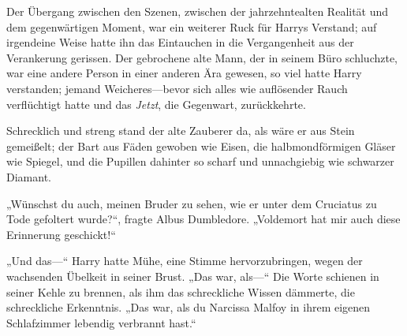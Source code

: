 % 
Der Übergang zwischen den Szenen, zwischen der jahrzehntealten Realität und dem gegenwärtigen Moment, war ein weiterer Ruck für Harrys Verstand; auf irgendeine Weise hatte ihn das Eintauchen in die Vergangenheit aus der Verankerung gerissen. Der gebrochene alte Mann, der in seinem Büro schluchzte, war eine andere Person in einer anderen Ära gewesen, so viel hatte Harry verstanden; jemand Weicheres—bevor sich alles wie auflösender Rauch verflüchtigt hatte und das \emph{Jetzt}, die Gegenwart, zurückkehrte.

Schrecklich und streng stand der alte Zauberer da, als wäre er aus Stein gemeißelt; der Bart aus Fäden gewoben wie Eisen, die halbmondförmigen Gläser wie Spiegel, und die Pupillen dahinter so scharf und unnachgiebig wie schwarzer Diamant.

„Wünschst du auch, meinen Bruder zu sehen, wie er unter dem Cruciatus zu Tode gefoltert wurde?“, fragte Albus Dumbledore. „Voldemort hat mir auch diese Erinnerung geschickt!“

„Und das—“ Harry hatte Mühe, eine Stimme hervorzubringen, wegen der wachsenden Übelkeit in seiner Brust. „Das war, als—“
Die Worte schienen in seiner Kehle zu brennen, als ihm das schreckliche Wissen dämmerte, die schreckliche Erkenntnis.
„Das war, als du Narcissa Malfoy in ihrem eigenen Schlafzimmer lebendig verbrannt hast.“

